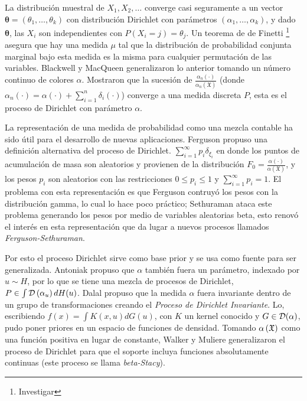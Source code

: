 La distribución muestral de $X_{1}, X_{2}, \ldots$ converge casi seguramente a un vector $\mathbf{\theta} = \left( \theta_{1}, %
\ldots, \theta_{k} \right)$ con distribución Dirichlet con parámetros $\left(\alpha_{1}, \ldots, \alpha_{k} \right)$, y dado %
$\mathbf{\theta}$, las $X_{i}$ son independientes con $P\left( X_{i} = j \right) = \theta_{j}$. Un teorema de de Finetti%
\footnote{Investigar} asegura que hay una medida $\mu$ tal que la distribución de probabilidad conjunta marginal bajo esta %
medida es la misma para cualquier permutación de las variables. Blackwell y MacQueen generalizaron lo anterior tomando un %
número continuo de colores $\alpha$. Mostraron que la sucesión de $\frac{\alpha_{n}(\cdot)}{\alpha_{n}\left( \mathfrak{X} %
\right)}$ (donde $\alpha_{n}(\cdot) = \alpha(\cdot) + \sum_{i = 1}^{n} \delta_{i}(\cdot)$) converge a una medida discreta $P$, %
esta es el proceso de Dirichlet con parámetro $\alpha$.

La representación de una medida de probabilidad como una mezcla contable ha sido útil para el desarrollo de nuevas aplicaciones. %
Ferguson propuso una definición alternativa del proceso de Dirichlet. $\sum_{i = 1}^{\infty} p_{i}\delta_{\xi_{i}}$ en donde %
los puntos de acumulación de masa son aleatorios y provienen de la distribución $F_{0} = \frac{\alpha(\cdot)}{\alpha\left( %
\mathfrak{X} \right)}$, y los pesos $p_i$ son aleatorios con las restricciones $0 \leq p_{i} \leq 1$ y $\sum_{i = 1}^{\infty}%
p_{i} = 1$. El problema con esta representación es que Ferguson contruyó los pesos con la distribución gamma, lo cual lo hace %
poco práctico; Sethuraman ataca este problema generando los pesos por medio de variables aleatorias beta, esto renovó el interés %
en esta representación que da lugar a nuevos procesos llamados \textit{Ferguson-Sethuraman}.

Por esto el proceso Dirichlet sirve como base prior y se usa como fuente para ser generalizada. Antoniak propuso que $\alpha$ %
también fuera un parámetro, indexado por $u \sim H$, por lo que se tiene una mezcla de procesos de Dirichlet, $P \in \int %
\D\left( \alpha_{u} \right) dH(u)$. Dalal propuso que la medida $\alpha$ fuera invariante dentro de un grupo de transformaciones %
creando el \textit{Proceso de Dirichlet Invariante}. Lo, escribiendo $f(x) = \int K(x, u) dG(u)$, con $K$ un kernel conocido %
y $G \in \mathcal{D}(\alpha)$, pudo poner priores en un espacio de funciones de densidad. Tomando $\alpha\left( \mathfrak{X} \right)$ como una función %
positiva en lugar de constante, Walker y Muliere generalizaron el proceso de Dirichlet para que el soporte incluya funciones %
absolutamente continuas (este proceso se llama \textit{beta-Stacy}).

